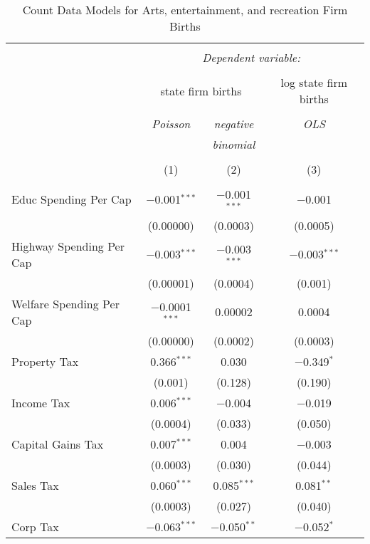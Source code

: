 
\begin{table}[!htbp] \centering 
  \caption{Count Data Models for Arts, entertainment, and recreation Firm Births} 
  \label{} 
\begin{tabular}{@{\extracolsep{5pt}}lccc} 
\\[-1.8ex]\hline 
\hline \\[-1.8ex] 
 & \multicolumn{3}{c}{\textit{Dependent variable:}} \\ 
\cline{2-4} 
\\[-1.8ex] & \multicolumn{2}{c}{state firm births} & log state firm births \\ 
\\[-1.8ex] & \textit{Poisson} & \textit{negative} & \textit{OLS} \\ 
 & \textit{} & \textit{binomial} & \textit{} \\ 
\\[-1.8ex] & (1) & (2) & (3)\\ 
\hline \\[-1.8ex] 
 Educ Spending Per Cap & $-$0.001$^{***}$ & $-$0.001$^{***}$ & $-$0.001 \\ 
  & (0.00000) & (0.0003) & (0.0005) \\ 
  Highway Spending Per Cap  & $-$0.003$^{***}$ & $-$0.003$^{***}$ & $-$0.003$^{***}$ \\ 
  & (0.00001) & (0.0004) & (0.001) \\ 
  Welfare Spending Per Cap  & $-$0.0001$^{***}$ & 0.00002 & 0.0004 \\ 
  & (0.00000) & (0.0002) & (0.0003) \\ 
  Property Tax & 0.366$^{***}$ & 0.030 & $-$0.349$^{*}$ \\ 
  & (0.001) & (0.128) & (0.190) \\ 
  Income Tax & 0.006$^{***}$ & $-$0.004 & $-$0.019 \\ 
  & (0.0004) & (0.033) & (0.050) \\ 
  Capital Gains Tax & 0.007$^{***}$ & 0.004 & $-$0.003 \\ 
  & (0.0003) & (0.030) & (0.044) \\ 
  Sales Tax & 0.060$^{***}$ & 0.085$^{***}$ & 0.081$^{**}$ \\ 
  & (0.0003) & (0.027) & (0.040) \\ 
  Corp Tax & $-$0.063$^{***}$ & $-$0.050$^{**}$ & $-$0.052$^{*}$ \\ 

\end{tabular}
\end{table}
